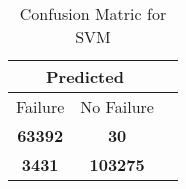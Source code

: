 \begin{table}[] 
\caption{Confusion Matric for SVM} 
\label{Table: Prediction Accuracy-NoneSVM100.0EKF-ignoresolarPanelDipole-solarPanelDipole} 
\centering 
\begin{tabular} 
 {@{}ccc@{}} 
\toprule 
\multicolumn{2}{c}{\textbf{Predicted}}
 \\ \midrule 
\multicolumn{1}{|c|}{Failure} & 
\multicolumn{1}{c|}{No Failure}
 \\ \midrule 
\multicolumn{1}{|c|}{\color{green}\textbf{63392}} & 
\multicolumn{1}{c|}{\color{red}\textbf{30}}
 \\ \midrule 
\multicolumn{1}{|c|}{\color{red}\textbf{3431}} & 
\multicolumn{1}{c|}{\color{green}\textbf{103275}}
 \\ \bottomrule 
\end{tabular} 
\end{table} 
